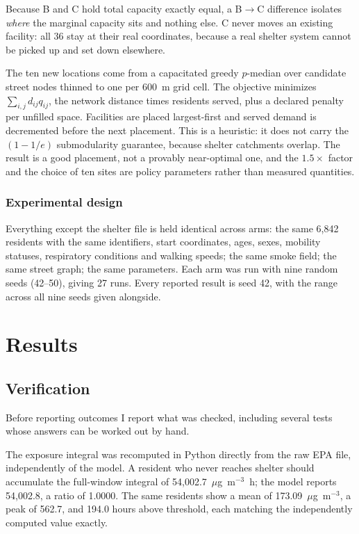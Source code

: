 \documentclass[graybox]{svmult}
\begin{document}
Because B and C hold total capacity exactly equal, a B$\rightarrow$C difference
isolates \emph{where} the marginal capacity sits and nothing else. C never moves
an existing facility: all 36 stay at their real coordinates, because a real
shelter system cannot be picked up and set down elsewhere.

The ten new locations come from a capacitated greedy $p$-median over candidate
street nodes thinned to one per 600~m grid cell. The objective minimizes
$\sum_{i,j} d_{ij} q_{ij}$, the network distance times residents served, plus a
declared penalty per unfilled space. Facilities are placed largest-first and
served demand is decremented before the next placement. This is a heuristic: it
does not carry the $(1-1/e)$ submodularity guarantee, because shelter catchments
overlap. The result is a good placement, not a provably near-optimal one, and
the $1.5\times$ factor and the choice of ten sites are policy parameters rather
than measured quantities.

\subsubsection{Experimental design}

Everything except the shelter file is held identical across arms: the same
6,842 residents with the same identifiers, start coordinates, ages, sexes,
mobility statuses, respiratory conditions and walking speeds; the same smoke
field; the same street graph; the same parameters. Each arm was run with nine
random seeds (42--50), giving 27 runs. Every reported result is seed 42, with
the range across all nine seeds given alongside.

\section{Results}
\label{sec:results}

\subsection{Verification}
\label{subsec:verification}

Before reporting outcomes I report what was checked, including several tests
whose answers can be worked out by hand.

The exposure integral was recomputed in Python directly from the raw EPA file,
independently of the model. A resident who never reaches shelter should
accumulate the full-window integral of 54,002.7~$\mu$g~m$^{-3}$~h; the model
reports 54,002.8, a ratio of 1.0000. The same residents show a mean of
173.09~$\mu$g~m$^{-3}$, a peak of 562.7, and 194.0 hours above threshold, each
matching the independently computed value exactly.
\end{document}
